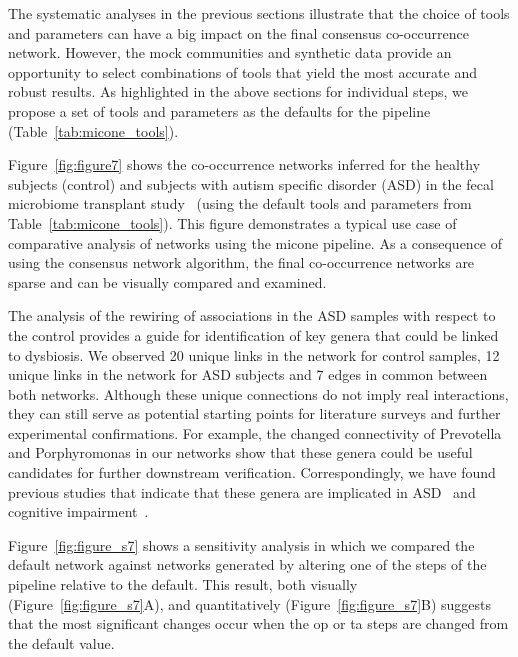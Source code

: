   The systematic analyses in the previous sections illustrate that the choice of tools and parameters can have a big impact on the final consensus co-occurrence network.
  However, the mock communities and synthetic data provide an opportunity to select combinations of tools that yield the most accurate and robust results.
  As highlighted in the above sections for individual steps, we propose a set of tools and parameters as the defaults for the pipeline (Table~\ref{tab:micone_tools}).

  Figure~\ref{fig:figure7} shows the co-occurrence networks inferred for the healthy subjects (control) and subjects with autism specific disorder (ASD) in the fecal microbiome transplant study~\cite{Kang2017} (using the default tools and parameters from Table~\ref{tab:micone_tools}).
  This figure demonstrates a typical use case of comparative analysis of networks using the \ac{micone} pipeline.
  As a consequence of using the consensus network algorithm, the final co-occurrence networks are sparse and can be visually compared and examined.

  The analysis of the rewiring of associations in the ASD samples with respect to the control provides a guide for identification of key genera that could be linked to dysbiosis.
  We observed 20 unique links in the network for control samples, 12 unique links in the network for ASD subjects and 7 edges in common between both networks.
  Although these unique connections do not imply real interactions, they can still serve as potential starting points for literature surveys and further experimental confirmations.
  For example, the changed connectivity of Prevotella and Porphyromonas in our networks show that these genera could be useful candidates for further downstream verification.
  Correspondingly, we have found previous studies that indicate that these genera are implicated in ASD~\cite{Kang2017,hoGutMicrobiotaChanges2020} and cognitive impairment~\cite{chiPorphyromonasGingivalisInducedCognitive2021}.

  Figure~\ref{fig:figure_s7} shows a sensitivity analysis in which we compared the default network against networks generated by altering one of the steps of the pipeline relative to the default.
  This result, both visually (Figure~\ref{fig:figure_s7}A), and quantitatively (Figure~\ref{fig:figure_s7}B)  suggests that the most significant changes occur when the \ac{op} or \ac{ta} steps are changed from the default value.

